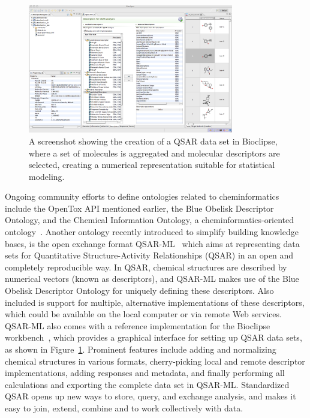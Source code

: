 \documentclass[11pt]{book}
\begin{document}
\begin{figure}[bt]
\begin{center}
\includegraphics[width=0.8\textwidth]{graphics/qsar-collab.png}
\end{center}
\caption{A screenshot showing the creation of a QSAR data set in Bioclipse,
where a set of molecules is aggregated and molecular descriptors are
selected, creating a numerical representation suitable for statistical
modeling.}
\label{fig:qsarml}
\end{figure}

Ongoing community efforts to define ontologies related to cheminformatics include
the OpenTox API mentioned earlier, the Blue Obelisk Descriptor Ontology, and the
Chemical Information Ontology, a cheminformatics-oriented ontology~\cite{url:cheminf}. 
Another ontology recently introduced to simplify building knowledge bases, is
the open exchange format QSAR-ML~\cite{Spjuth:2010fk} which aims at representing data sets
for Quantitative Structure-Activity Relationships (QSAR) in an open and completely
reproducible way. In QSAR, chemical structures are described by numerical vectors
(known as descriptors), and QSAR-ML makes use of the Blue Obelisk Descriptor Ontology for
uniquely defining these descriptors. Also included is support for multiple, alternative
implementations of these descriptors, which could be available on the local computer
or via remote Web services. QSAR-ML also comes with a reference implementation for
the Bioclipse workbench~\cite{Spjuth2009,Spjuth2007}, which provides a graphical
interface for setting up QSAR data sets, as shown in Figure~\ref{fig:qsarml}.
Prominent features include adding and
normalizing chemical structures in various formats, cherry-picking local and
remote descriptor implementations, adding responses and metadata, and finally
performing all calculations and exporting the complete data set in QSAR-ML.
Standardized QSAR opens up new ways to store, query, and exchange analysis,
and makes it easy to join, extend, combine and to work collectively with data.
\end{document}
